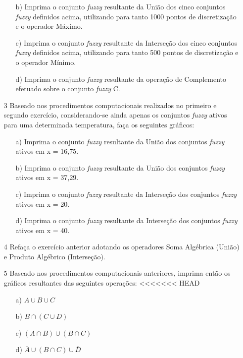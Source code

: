 \documentclass{report}
\begin{document}
\begin{enumerate}
\begin{enumerate}
\item[b)] Imprima o conjunto \emph{fuzzy} resultante da União dos cinco conjuntos \emph{fuzzy} definidos acima,
utilizando para tanto 1000 pontos de discretização e o operador Máximo.


\item[c)] Imprima o conjunto \emph{fuzzy} resultante da Interseção dos cinco conjuntos \emph{fuzzy} definidos
acima, utilizando para tanto 500 pontos de discretização e o operador Mínimo.


\item[d)] Imprima o conjunto \emph{fuzzy} resultante da operação de Complemento efetuado sobre o
conjunto \emph{fuzzy} C. 
\end{enumerate}



\item[3] Baseado nos procedimentos computacionais realizados no primeiro e segundo exercício,
considerando-se ainda apenas os conjuntos \emph{fuzzy} ativos para uma determinada temperatura,
faça os seguintes gráficos:
\begin{enumerate}
\item[a)] Imprima o conjunto \emph{fuzzy} resultante da União dos conjuntos \emph{fuzzy} ativos em x = 16,75.
\item[b)] Imprima o conjunto \emph{fuzzy} resultante da União dos conjuntos \emph{fuzzy} ativos em x = 37,29.
\item[c)] Imprima o conjunto \emph{fuzzy} resultante da Interseção dos conjuntos \emph{fuzzy} ativos em x = 20.
\item[d)] Imprima o conjunto \emph{fuzzy} resultante da Interseção dos conjuntos \emph{fuzzy} ativos em x = 40.
\end{enumerate}


\item[4] Refaça o exercício anterior adotando os operadores Soma Algébrica (União) e Produto
Algébrico (Interseção).


\item[5] Baseado nos procedimentos computacionais anteriores, imprima então os gráficos resultantes
das seguintes operações:
<<<<<<< HEAD
\begin{enumerate}
\item[a)] $A \cup B \cup C$
\item[b)] $B \cap (C\cup D)$
\item[c)] $(A \cap B) \cup (B \cap C)$
\item[d)] $\overline{A}\cup (B\cap C) \cup \overline{D}$
\end{enumerate}

\end{enumerate}
\end{document}
